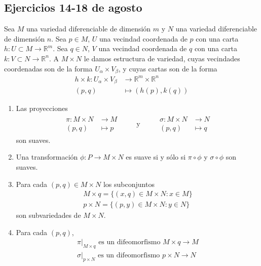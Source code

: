 \documentclass[spanish]{book}
\theoremstyle{definition}
\newcommand{\R}{\mathbb{R}}
\begin{document}
	
	
	\clearpage
	\subsection{Ejercicios 14-18 de agosto}
	Sea $M$ una variedad diferenciable de dimensión $m$ y $N$ una variedad diferenciable de dimensión $n$. Sea $p\in M$, $U$ una vecindad coordenada de $p$ con una carta $h:U\subset M\to\R^m$. Sea $q\in N$, $V$ una vecindad coordenada de $q$ con una carta $k:V\subset N\to\R^n$. A $M\times N$ le damos estructura de variedad, cuyas vecindades coordenadas son de la forma $U_\alpha\times V_\beta$, y cuyas cartas son de la forma 
	\begin{align*}
		h\times k:U_\alpha\times V_\beta&\to\R^m\times\R^n\\
		(p,q)&\mapsto \left(h(p),k(q)\right)
	\end{align*}
	\begin{enumerate}
		\item Las proyecciones 
		\begin{align*}
			\begin{aligned}
				\pi:M\times N&\to M\\
				(p,q)&\mapsto p
			\end{aligned}
			\qquad\text{ y }\qquad
			\begin{aligned}
				\sigma:M\times N&\to N\\
				(p,q)&\mapsto q
			\end{aligned}
		\end{align*}
		son suaves.
		
		\item Una transformación $\phi:P\to M\times N$ es suave si y sólo si $\pi\circ\phi$ y $\sigma\circ\phi$ son suaves.
		\item Para cada $(p,q)\in M\times N$ los subconjuntos
		\begin{align*}
			M\times q=\{(x,q)\in M\times N:x\in M\}\\
			p\times N=\{(p,y)\in M\times N:y\in N\}
		\end{align*}
		son subvariedades de $M\times N$.
		\item Para cada $(p,q)$,
		\begin{align*}
			\pi|_{M\times q}\text{ es un difeomorfismo }M\times q\to M\\
			\sigma|_{p\times N}\text{ es un difeomorfismo }p\times N\to N
		\end{align*}
	\end{enumerate}
\end{document}
